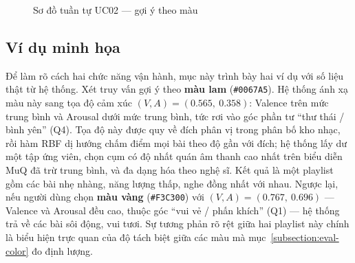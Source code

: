 \documentclass[../DoAn.tex]{subfiles}
\begin{document}
\begin{figure}[h!]
\centering
{}
\caption{Sơ đồ tuần tự UC02 --- gợi ý theo màu}
\label{fig:seq-uc02}
\end{figure}

\subsection{Ví dụ minh họa}
\label{subsection:4.2.4}
Để làm rõ cách hai chức năng vận hành, mục này trình bày hai ví dụ với số liệu thật từ hệ thống. Xét truy vấn gợi ý theo \textbf{màu lam} (\texttt{\#0067A5}). Hệ thống ánh xạ màu này sang tọa độ cảm xúc $(V, A) = (0.565,\ 0.358)$: Valence trên mức trung bình và Arousal dưới mức trung bình, tức rơi vào góc phần tư ``thư thái / bình yên'' (Q4). Tọa độ này được quy về đích phân vị trong phân bố kho nhạc, rồi hàm RBF dị hướng chấm điểm mọi bài theo độ gần với đích; hệ thống lấy dư một tập ứng viên, chọn cụm có độ nhất quán âm thanh cao nhất trên biểu diễn MuQ đã trừ trung bình, và đa dạng hóa theo nghệ sĩ. Kết quả là một playlist gồm các bài nhẹ nhàng, năng lượng thấp, nghe đồng nhất với nhau. Ngược lại, nếu người dùng chọn \textbf{màu vàng} (\texttt{\#F3C300}) với $(V, A) = (0.767,\ 0.696)$ --- Valence và Arousal đều cao, thuộc góc ``vui vẻ / phấn khích'' (Q1) --- hệ thống trả về các bài sôi động, vui tươi. Sự tương phản rõ rệt giữa hai playlist này chính là biểu hiện trực quan của độ tách biệt giữa các màu mà mục~\ref{subsection:eval-color} đo định lượng.
\end{document}
